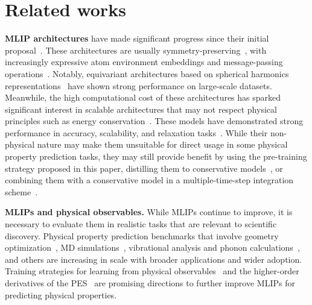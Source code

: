 \section{Related works}
\textbf{MLIP architectures} have made significant progress since their initial proposal~\citep{behler2007generalized}. These architectures are usually symmetry-preserving~\citep{smith2017ani, schutt2017schnet, gilmer2017neural, chmiela2017machine, artrith2017efficient, unke2018reactive, zhang2018end, zubatyuk2019accurate, smith2020ani, kovacs2021linear}, with increasingly expressive atom environment embeddings and message-passing operations~\citep{klicpera2020Directional, gasteiger2021gemnet, schutt2021equivariant, liu2021spherical, unke2021spookynet, chen2022universal, deng2023chgnet, cheng2024cartesian}. Notably, equivariant architectures based on spherical harmonics representations~\citep{thomas2018tensor, tholke2021equivariant, batzner20223, musaelian2022learning, batatia2022mace, passaro2023reducing, liao2023equiformerv2, bochkarev2024graph, park2024scalable, batatia2025design} have shown strong performance on large-scale datasets. Meanwhile, the high computational cost of these architectures has sparked significant interest in scalable architectures that may not respect physical principles such as energy conservation~\citep{langer2024probing, brehmer2024does, hu2021forcenet, yang2024mattersim, qu2024the, neumann2024orb}. These models have demonstrated strong performance in accuracy, scalability, and relaxation tasks~\citep{oc20, riebesell2023matbench}. While their non-physical nature may make them unsuitable for direct usage in some physical property prediction tasks, they may still provide benefit by using the pre-training strategy proposed in this paper, distilling them to conservative models~\citep{amin2025towards}, or combining them with a conservative model in a multiple-time-step integration scheme~\citep{bigi2024dark}. 

\textbf{MLIPs and physical observables.} While MLIPs continue to improve, it is necessary to evaluate them in realistic tasks that are relevant to scientific discovery. Physical property prediction benchmarks that involve geometry optimization~\citep{riebesell2023matbench, lan2023adsorbml, wander2024cattsunami}, MD simulations~\citep{fu2023forces, kovacs2023mace, moore2024computing, sabanes2024enhancing, eastman2024nutmeg}, vibrational analysis and phonon calculations~\citep{pota2024thermal, loew2024universal, wines2024chips}, and others are increasing in scale with broader applications and wider adoption. Training strategies for learning from physical observables~\citep{wang2020differentiable,  greener2024differentiable, rocken2024predicting, raja2024stability} and the higher-order derivatives of the PES~\citep{fang2024phonon, williams2025hessian} are promising directions to further improve MLIPs for predicting physical properties.